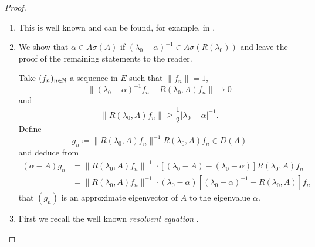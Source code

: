 \begin{proof}
\begin{enumerate}[\upshape (i), wide, labelindent=.25em]
\item 
This is well known and can be found, for example, in \textcite[VII.9.2]{dunfordschwartz:1958}.

\item 
We show that $\alpha \in A\sigma(A)$ if\/ $(\lambda_{0}-\alpha)^{-1} \in A\sigma(R(\lambda_{0}))$ and leave the proof of the remaining statements to the reader.

Take $(f_{n})_{n \in \mathbb{N}}$ a sequence in $E$ such that $\|f_{n}\| = 1$, 
%
\[
	\|(\lambda_{0}-\alpha)^{-1}f_{n} - R(\lambda_{0},A)f_{n}\| \to 0
\]
%
and 
%
\[
	\|R(\lambda_{0},A)f_{n}\| \geq \frac{1}{2}|\lambda_{0} - \alpha|^{-1} .
\]
%
Define
\[
g_{n} \coloneq \|R(\lambda_{0},A)f_{n}\|^{-1}R(\lambda_{0},A)f_{n} \in D(A)
\]
and deduce from
\begin{align*}
(\alpha-A)g_{n} &= \|R(\lambda_{0},A)f_{n}\|^{-1} \cdot 
		[(\lambda_{0}-A) - (\lambda_{0}-\alpha)]R(\lambda_{0},A)f_{n} \\  
	&= \|R(\lambda_{0},A)f_{n}\|^{-1} \cdot 			(\lambda_{0}-\alpha)[(\lambda_{0}-\alpha)^{-1} - R(\lambda_{0},A)]f_{n}
\end{align*}
that $(g_{n})$ is an approximate eigenvector of\/ $A$ to the eigenvalue $\alpha$.

\item 
First we recall the well known \emph{resolvent equation}%
. 


\end{enumerate}
\end{proof}
